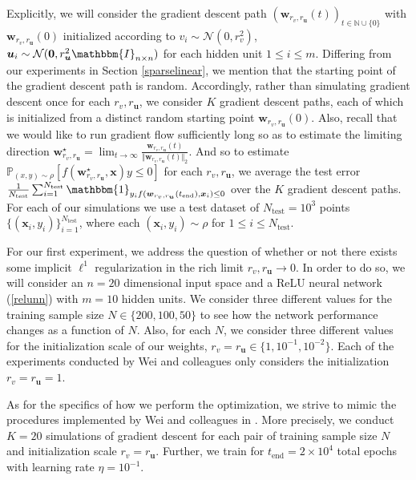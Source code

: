 \documentclass{article}
\begin{document}
Explicitly, we will consider the gradient descent path $(\boldsymbol{w}_{r_v, r_{\boldsymbol{u}}}(t))_{t \in \mathbb{N} \cup \{0\}}$ with $\boldsymbol{w}_{r_v, r_{\boldsymbol{u}}}(0)$ initialized according to $v_i \sim \mathcal{N}(0, r_v^2)$, $\boldsymbol{u}_i \sim \mathcal{N}(\boldsymbol{0}, r_{\boldsymbol{u}}^2 \mathbbm{I}_{n \times n})$ for each hidden unit $1 \leq i \leq m$. Differing from our experiments in Section \ref{sparselinear}, we mention that the starting point of the gradient descent path is random. Accordingly, rather than simulating gradient descent once for each $r_v, r_{\boldsymbol{u}}$, we consider $K$ gradient descent paths, each of which is initialized from a distinct random starting point $\boldsymbol{w}_{r_v, r_{\boldsymbol{u}}}(0)$. Also, recall that we would like to run gradient flow sufficiently long so as to estimate the limiting direction $\boldsymbol{w}_{r_v, r_{\boldsymbol{u}}}^{\star} = \lim_{t \to \infty} \frac{\boldsymbol{w}_{r_v, r_{\boldsymbol{u}}}(t)}{\Vert \boldsymbol{w}_{r_v, r_{\boldsymbol{u}}}(t) \Vert_2}$.  And so to estimate $\mathbb{P}_{(x,y) \sim \rho}[f(\boldsymbol{w}_{r_v, r_{\boldsymbol{u}}}^{\star}, \boldsymbol{x})y \leq 0]$ for each $r_v, r_{\boldsymbol{u}}$, we average the test error $\frac{1}{N_{\text{test}}}\sum_{i=1}^{N_{\text{test}}} \mathbbm{1}_{y_i f(\boldsymbol{w}_{r_v, r_{\boldsymbol{u}}}(t_{\text{end}}), \boldsymbol{x}_i) \leq 0}$ over the $K$ gradient descent paths. For each of our simulations we use a test dataset of $N_{\text{test}} = 10^3$ points $\{(\boldsymbol{x}_i, y_i) \}_{i=1}^{N_{\text{test}}}$, where each $(\boldsymbol{x}_i, y_i) \sim \rho$ for $1 \leq i \leq N_{\text{test}}$.

For our first experiment, we address the question of whether or not there exists some implicit $\ell^1$ regularization in the rich limit $r_v, r_{\boldsymbol{u}} \rightarrow 0$. In order to do so, we will consider an $n=20$ dimensional input space and a ReLU neural network (\ref{relunn}) with $m=10$ hidden units. We consider three different values for the training sample size $N \in \{200, 100, 50\}$ to see how the network performance changes as a function of $N$. Also, for each $N$, we consider three different values for the initialization scale of our weights, $r_v = r_{\boldsymbol{u}} \in \{1, 10^{-1}, 10^{-2}\}$. Each of the experiments conducted by Wei and colleagues only considers the initialization $r_v = r_{\boldsymbol{u}} = 1$.

As for the specifics of how we perform the optimization, we strive to mimic the procedures implemented by Wei and colleagues in \cite{wei2019regularization}. More precisely, we conduct $K=20$ simulations of gradient descent for each pair of training sample size $N$ and initialization scale $r_v = r_{\boldsymbol{u}}$. Further, we train for $t_{\text{end}} = 2\times 10^4$ total epochs with learning rate $\eta = 10^{-1}$.
\end{document}
